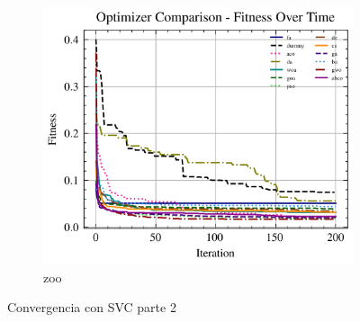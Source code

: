 \begin{figure}[htb]
    \begin{subfigure}[b]{0.45\textwidth}
        \includegraphics[width=\textwidth]{imagenes/fitness_charts/img/binary/zoo/optimizers_fitness_svc.png}
        \caption{zoo}
        \label{fig:convergencia_zoo_svc}
    \end{subfigure}
    \caption{Convergencia con SVC parte 2}
    \label{fig:convergencia_svc_2}
\end{figure}

